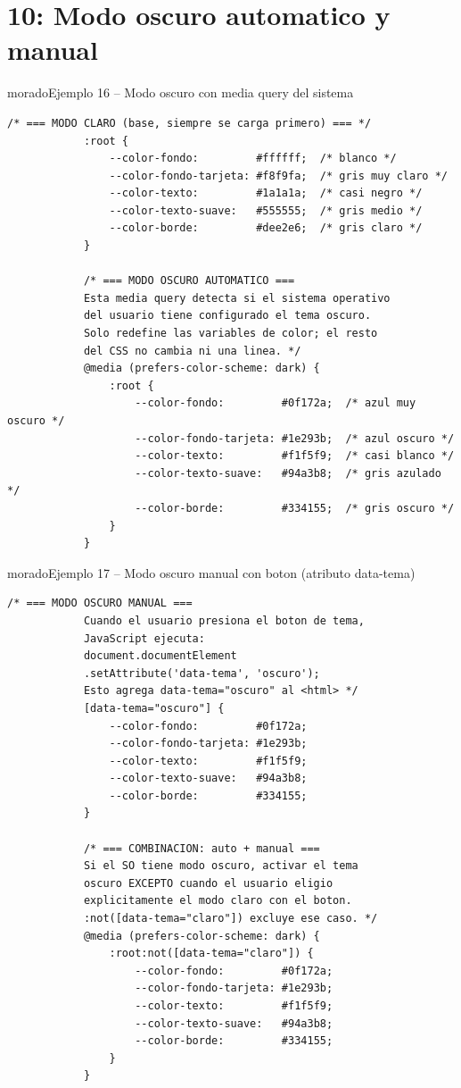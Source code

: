 \documentclass[11pt,a4paper]{article}
\begin{document}
	\section{10: Modo oscuro automatico y manual}
	
	\begin{cajacodigo}{morado}{Ejemplo 16 -- Modo oscuro con media query del sistema}
		\begin{lstlisting}[style=codecss]
			/* === MODO CLARO (base, siempre se carga primero) === */
			:root {
				--color-fondo:         #ffffff;  /* blanco */
				--color-fondo-tarjeta: #f8f9fa;  /* gris muy claro */
				--color-texto:         #1a1a1a;  /* casi negro */
				--color-texto-suave:   #555555;  /* gris medio */
				--color-borde:         #dee2e6;  /* gris claro */
			}
			
			/* === MODO OSCURO AUTOMATICO ===
			Esta media query detecta si el sistema operativo
			del usuario tiene configurado el tema oscuro.
			Solo redefine las variables de color; el resto
			del CSS no cambia ni una linea. */
			@media (prefers-color-scheme: dark) {
				:root {
					--color-fondo:         #0f172a;  /* azul muy oscuro */
					--color-fondo-tarjeta: #1e293b;  /* azul oscuro */
					--color-texto:         #f1f5f9;  /* casi blanco */
					--color-texto-suave:   #94a3b8;  /* gris azulado */
					--color-borde:         #334155;  /* gris oscuro */
				}
			}
		\end{lstlisting}
	\end{cajacodigo}
	
	\begin{cajacodigo}{morado}{Ejemplo 17 -- Modo oscuro manual con boton (atributo data-tema)}
		\begin{lstlisting}[style=codecss]
			/* === MODO OSCURO MANUAL ===
			Cuando el usuario presiona el boton de tema,
			JavaScript ejecuta:
			document.documentElement
			.setAttribute('data-tema', 'oscuro');
			Esto agrega data-tema="oscuro" al <html> */
			[data-tema="oscuro"] {
				--color-fondo:         #0f172a;
				--color-fondo-tarjeta: #1e293b;
				--color-texto:         #f1f5f9;
				--color-texto-suave:   #94a3b8;
				--color-borde:         #334155;
			}
			
			/* === COMBINACION: auto + manual ===
			Si el SO tiene modo oscuro, activar el tema
			oscuro EXCEPTO cuando el usuario eligio
			explicitamente el modo claro con el boton.
			:not([data-tema="claro"]) excluye ese caso. */
			@media (prefers-color-scheme: dark) {
				:root:not([data-tema="claro"]) {
					--color-fondo:         #0f172a;
					--color-fondo-tarjeta: #1e293b;
					--color-texto:         #f1f5f9;
					--color-texto-suave:   #94a3b8;
					--color-borde:         #334155;
				}
			}
		\end{lstlisting}
	\end{cajacodigo}
	
\end{document}
